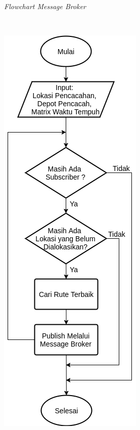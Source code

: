 \begin{figure}[!]
\begin{subfigure}[t]{0.3\textwidth}
		\caption{\textit{Flowchart Message Broker}}
		\label{fig:test-flowchart-normal-global-broker}
	\end{subfigure}%
	~
	\begin{subfigure}[t]{0.39\textwidth}
		\centering
		\includegraphics[width=\textwidth]{Resources/Images/test-flowchart-normal-global-publisher}

\end{subfigure}
\end{figure}
